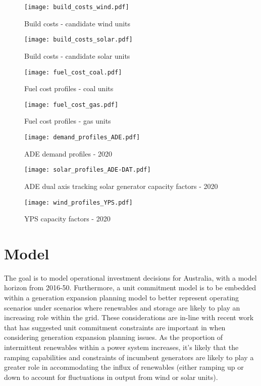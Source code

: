 \documentclass{article}
\begin{document}
\begin{figure}
	\texttt{[image: build\_costs\_wind.pdf]}
	\caption{Build costs - candidate wind units}
\end{figure}

\begin{figure}
	\texttt{[image: build\_costs\_solar.pdf]}
	\caption{Build costs - candidate solar units}
\end{figure}

\begin{figure}
	\texttt{[image: fuel\_cost\_coal.pdf]}
	\caption{Fuel cost profiles - coal units}
\end{figure}

\begin{figure}
	\texttt{[image: fuel\_cost\_gas.pdf]}
	\caption{Fuel cost profiles - gas units}
\end{figure}

\begin{figure}
	\texttt{[image: demand\_profiles\_ADE.pdf]}
	\caption{ADE demand profiles - 2020}
\end{figure}

\begin{figure}
	\texttt{[image: solar\_profiles\_ADE-DAT.pdf]}
	\caption{ADE dual axis tracking solar generator capacity factors - 2020}
\end{figure}

\begin{figure}
	\texttt{[image: wind\_profiles\_YPS.pdf]}
	\caption{YPS capacity factors - 2020}
\end{figure}


\section{Model}
The goal is to model operational investment decisions for Australia, with a model horizon from 2016-50. Furthermore, a unit commitment model is to be embedded within a generation expansion planning model to better represent operating scenarios under scenarios where renewables and storage are likely to play an increasing role within the grid. These considerations are in-line with recent work that has suggested unit commitment constraints are important in when considering generation expansion planning issues. As the proportion of intermittent renewables within a power system increases, it's likely that the ramping capabilities and constraints of incumbent generators are likely to play a greater role in accommodating the influx of renewables (either ramping up or down to account for fluctuations in output from wind or solar units). 
\end{document}
